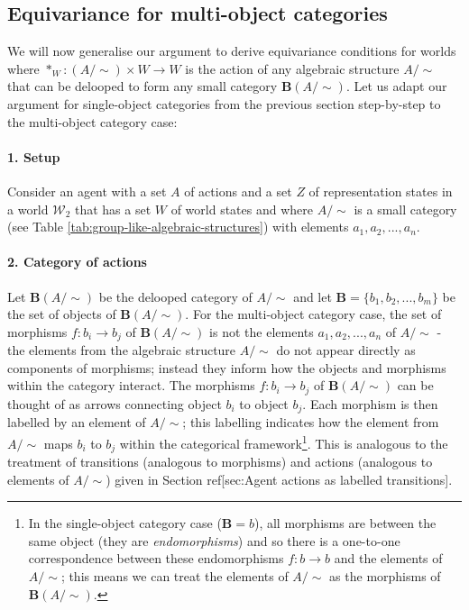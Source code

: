 \subsection{Equivariance for multi-object categories}

We will now generalise our argument to derive equivariance conditions for worlds where $*_{W}: (A/\sim) \times W \to W$ is the action of any algebraic structure $A/\sim$ that can be delooped to form any small category $\textbf{B}(A/\sim)$.
Let us adapt our argument for single-object categories from the previous section step-by-step to the multi-object category case:

\paragraph{1. Setup}
Consider an agent with a set $A$ of actions and a set $Z$ of representation states in a world $\mathscr{W}_{2}$ that has a set $W$ of world states and where $A/\sim$ is a small category (see Table \ref{tab:group-like-algebraic-structures}) with elements $a_{1}, a_{2}, ..., a_{n}$.

\paragraph{2. Category of actions}
Let $\textbf{B}(A/\sim)$ be the delooped category of $A/\sim$ and let $\textbf{B} = \{b_{1}, b_{2}, ..., b_{m}\}$ be the set of objects of $\textbf{B}(A/\sim)$.
For the multi-object category case, the set of morphisms $f: b_{i} \to b_{j}$ of $\textbf{B}(A/\sim)$ is not the elements $a_{1}, a_{2}, ..., a_{n}$ of $A/\sim$ - the elements from the algebraic structure $A/\sim$ do not appear directly as components of morphisms; instead they inform how the objects and morphisms within the category interact.
The morphisms $f: b_{i} \to b_{j}$ of $\textbf{B}(A/\sim)$ can be thought of as arrows connecting object $b_{i}$ to object $b_{j}$.
Each morphism is then labelled by an element of $A/\sim$; this labelling indicates how the element from $A/\sim$ maps $b_{i}$ to $b_{j}$ within the categorical framework\footnote{In the single-object category case ($\textbf{B} = b$), all morphisms are between the same object (they are \textit{endomorphisms}) and so there is a one-to-one correspondence between these endomorphisms $f: b \to b$ and the elements of $A/\sim$; this means we can treat the elements of $A/\sim$ as the morphisms of $\textbf{B}(A/\sim)$.}.
This is analogous to the treatment of transitions (analogous to morphisms) and actions (analogous to elements of $A/\sim$) given in Section ref[sec:Agent actions as labelled transitions].

